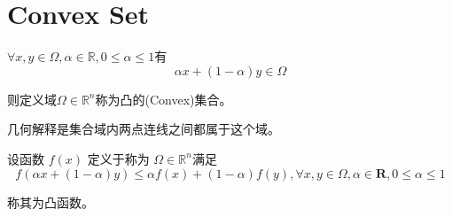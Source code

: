 \section{Convex Set}

\begin{definition}[凸集]
    $ \forall x, y \in \Omega, \alpha \in \mathbb{R}, 0 \leq \alpha \leq 1 $有
    \begin{equation} \alpha x+(1-\alpha) y \in \Omega \end{equation}

    则定义域$ \Omega \in \mathbb{R}^{n} $称为凸的(Convex)集合。
\end{definition}

几何解释是集合域内两点连线之间都属于这个域。

\begin{definition}[凸函数]
    设函数 $ f(x) $ 定义于称为 $ \Omega \in \mathbb{R}^{n} $满足
    \begin{equation} f(\alpha x+(1-\alpha) y) \leq \alpha f(x)+(1-\alpha) f(y), \forall x, y \in \Omega, \alpha \in \mathbf{R}, 0 \leq \alpha \leq 1 \end{equation}

    称其为凸函数。 
\end{definition}

